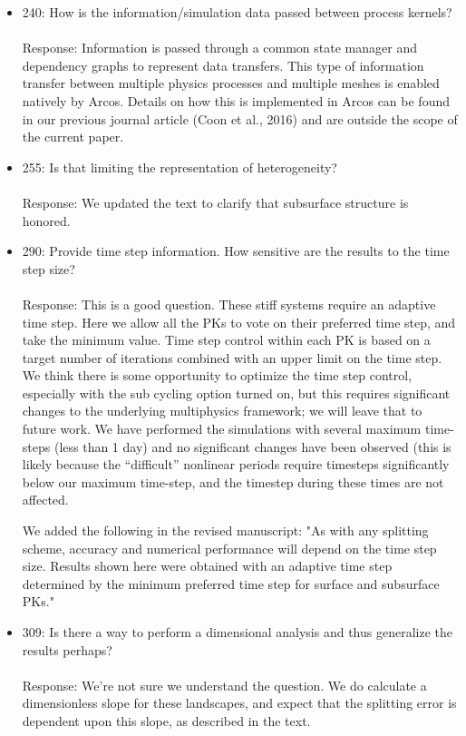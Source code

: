\documentclass[12pt]{article}\usepackage{amsmath, amssymb, graphicx, array}
\begin{document}
\begin{itemize}
\item 240: How is the information/simulation data passed between process kernels? \\ \\
Response:  Information is passed through a common state manager and dependency graphs to represent data transfers.  This type of information transfer between multiple physics processes and multiple meshes is enabled natively by Arcos.  Details on how this is implemented in Arcos can be found in our previous journal article (Coon et al., 2016) and are outside the scope of the current paper. 

\item 255: Is that limiting the representation of heterogeneity? \\ \\
Response: We updated the text to clarify that subsurface structure is honored. 

\item 290: Provide time step information. How sensitive are the results to the time step size? \\ \\
  Response:  This is a good question. These stiff systems require an adaptive time step. Here we allow all the PKs to vote on their preferred time step, and take the minimum value. Time step control within each PK is based on a target number of iterations combined with an upper limit on the time step. We think there is some opportunity to optimize the time step control, especially with the sub cycling option turned on, but this requires significant changes to the underlying multiphysics framework; we will leave that to future work.  We have performed the simulations with several maximum time-steps (less than 1 day) and no significant changes have been observed (this is likely because the ``difficult'' nonlinear periods require timesteps significantly below our maximum time-step, and the timestep during these times are not affected.
  
We added the following in the revised manuscript: "As with any splitting scheme, accuracy and numerical performance will depend on the time step size. Results shown here were obtained with an adaptive time step determined by the minimum preferred time step for surface and subsurface PKs." 

\item 309: Is there a way to perform a dimensional analysis and thus generalize the results perhaps? \\ \\
Response: We're not sure we understand the question. We do calculate a dimensionless slope for these landscapes, and expect that the splitting error is dependent upon this slope, as described in the text.


\end{itemize}
\end{document}
